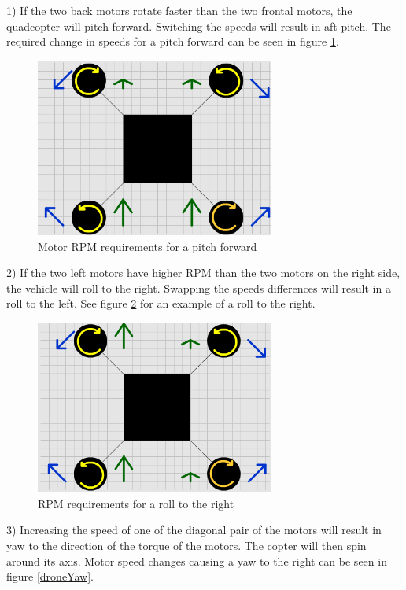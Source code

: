 1) If the two back motors rotate faster than the two frontal motors, the quadcopter will pitch forward. Switching the speeds will result in aft pitch. The required change in speeds for a pitch forward can be seen in figure \ref{dronePitch}.
\begin{figure}[H]
  \centering
    \includegraphics[width=0.7\textwidth]{images/dronePitch.png}
	\caption{Motor RPM requirements for a pitch forward}
	\label{dronePitch}
\end{figure}
2) If the two left motors have higher RPM than the two motors on the right side, the vehicle will roll to the right. Swapping the speeds differences will result in a roll to the left. See figure \ref{droneRoll} for an example of a roll to the right.
\begin{figure}[H]
  \centering
    \includegraphics[width=0.7\textwidth]{images/droneRoll.png}
	\caption{RPM requirements for a roll to the right}
	\label{droneRoll}
\end{figure}
3) Increasing the speed of one of the diagonal pair of the motors will result in yaw to the direction of the torque of the motors. The copter will then spin around its axis. Motor speed changes causing a yaw to the right can be seen in figure \ref{droneYaw}.
